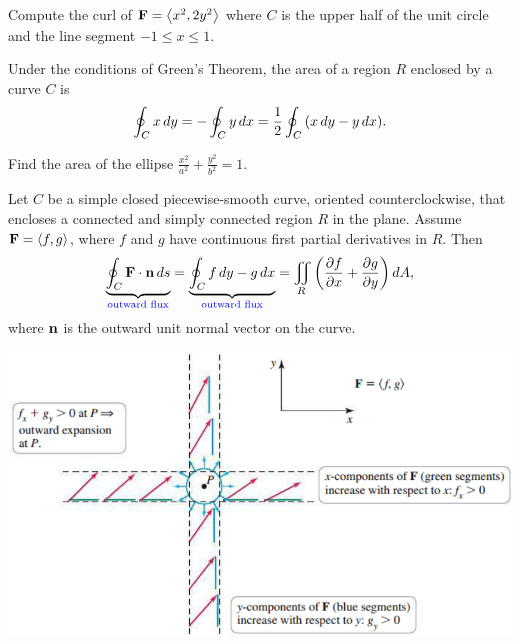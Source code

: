 \documentclass[../mathNotesPreamble]{subfiles}
\begin{document}
  \begin{ex*}
    Compute the curl of $\mathbf F={\left\langle x^2,2y^2 \right\rangle}$ where $C$ is the upper half of the unit circle and the line segment $-1\leq x\leq 1$.
  \end{ex*}

  \begin{thmBox*}
    Under the conditions of Green's Theorem, the area of a region $R$ enclosed by a curve $C$ is
      \[\oint_C x\,dy=-\oint_C y\,dx=\frac{1}{2}\oint_C{\left(x\,dy-y\,dx\right)}.\]
  \end{thmBox*}

  \begin{ex*}
    Find the area of the ellipse $\displaystyle \frac{x^2}{a^2}+\frac{y^2}{b^2}=1$.
  \end{ex*}
  \pagebreak

  \begin{thmBox*}
    Let $C$ be a simple closed piecewise-smooth curve, oriented counterclockwise, that encloses a connected and simply connected region $R$ in the plane. Assume $\mathbf F={\left\langle f,g \right\rangle}$, where $f$ and $g$ have continuous first partial derivatives in $R$. Then
      \[\underbrace{\oint_C \mathbf F\cdot {\mathbf{n}}\, ds}_{\textcolor{blue}{\textnormal{outward flux}}}=\underbrace{\oint_C f\,dy-g\,dx}_{\textcolor{blue}{\textnormal{outward flux}}}=\iint\limits_R{\left(\frac{\partial f}{\partial x}+\frac{\partial g}{\partial y}\right)}\,dA,\]
    where ${\mathbf{n}}$ is the outward unit normal vector on the curve.
  \end{thmBox*}

  \begin{flushright}
    \includegraphics[width=0.9\linewidth]{../images/briggs_17_04/fig17_33}
  \end{flushright}
\end{document}
